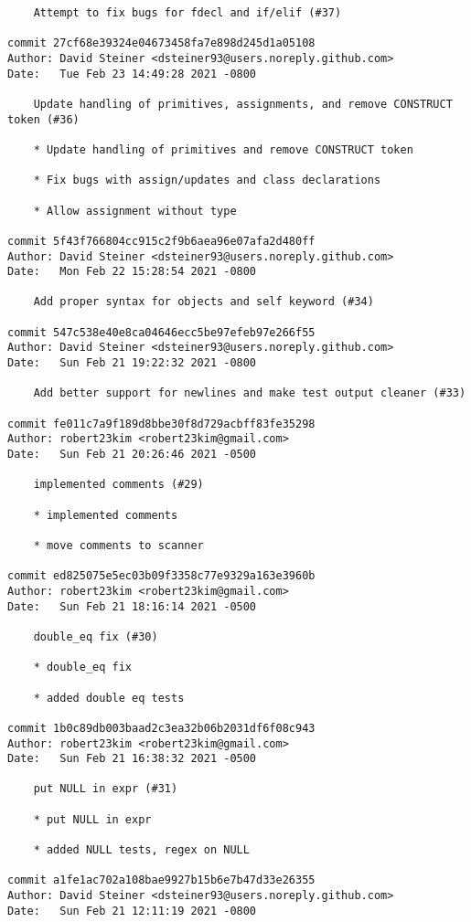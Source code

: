 \documentclass{article}
\begin{document}
\begin{verbatim}
    Attempt to fix bugs for fdecl and if/elif (#37)

commit 27cf68e39324e04673458fa7e898d245d1a05108
Author: David Steiner <dsteiner93@users.noreply.github.com>
Date:   Tue Feb 23 14:49:28 2021 -0800

    Update handling of primitives, assignments, and remove CONSTRUCT token (#36)
    
    * Update handling of primitives and remove CONSTRUCT token
    
    * Fix bugs with assign/updates and class declarations
    
    * Allow assignment without type

commit 5f43f766804cc915c2f9b6aea96e07afa2d480ff
Author: David Steiner <dsteiner93@users.noreply.github.com>
Date:   Mon Feb 22 15:28:54 2021 -0800

    Add proper syntax for objects and self keyword (#34)

commit 547c538e40e8ca04646ecc5be97efeb97e266f55
Author: David Steiner <dsteiner93@users.noreply.github.com>
Date:   Sun Feb 21 19:22:32 2021 -0800

    Add better support for newlines and make test output cleaner (#33)

commit fe011c7a9f189d8bbe30f8d729acbff83fe35298
Author: robert23kim <robert23kim@gmail.com>
Date:   Sun Feb 21 20:26:46 2021 -0500

    implemented comments (#29)
    
    * implemented comments
    
    * move comments to scanner

commit ed825075e5ec03b09f3358c77e9329a163e3960b
Author: robert23kim <robert23kim@gmail.com>
Date:   Sun Feb 21 18:16:14 2021 -0500

    double_eq fix (#30)
    
    * double_eq fix
    
    * added double eq tests

commit 1b0c89db003baad2c3ea32b06b2031df6f08c943
Author: robert23kim <robert23kim@gmail.com>
Date:   Sun Feb 21 16:38:32 2021 -0500

    put NULL in expr (#31)
    
    * put NULL in expr
    
    * added NULL tests, regex on NULL

commit a1fe1ac702a108bae9927b15b6e7b47d33e26355
Author: David Steiner <dsteiner93@users.noreply.github.com>
Date:   Sun Feb 21 12:11:19 2021 -0800


\end{verbatim}
\end{document}
